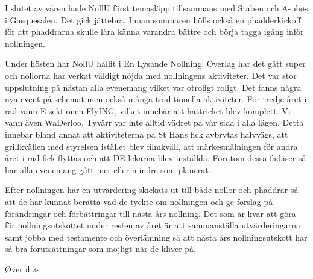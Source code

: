 \documentclass[../_main/handlingar.tex]{subfiles}
\begin{document}
I slutet av våren hade NollU först temasläpp tillsammans med Staben och A-phøs i Gasquesalen. Det gick jättebra. Innan sommaren hölls också en phadderkickoff för att phaddrarna skulle lära känna varandra bättre och börja tagga igång inför nollningen.

Under hösten har NollU hållit i En Lysande Nollning. Överlag har det gått super och nollorna har verkat väldigt nöjda med nollningens aktiviteter. Det var stor uppslutning på nästan alla evenemang vilket var otroligt roligt. Det fanns några nya event på schemat men också många traditionella aktiviteter. För tredje året i rad vann E-sektionen FlyING, vilket innebär att hattricket blev komplett. Vi vann även WaDerloo. Tyvärr var inte alltid vädret på vår sida i alla lägen. Detta innebar bland annat att aktiviteterna på St Hans fick avbrytas halvvägs, att grillkvällen med styrelsen istället blev filmkväll, att märkesmålningen för andra året i rad fick flyttas och att DE-lekarna blev inställda. Förutom dessa fadäser så har alla evenemang gått mer eller mindre som planerat.

Efter nollningen har en utvärdering skickats ut till både nollor och phaddrar så att de har kunnat berätta vad de tyckte om nollningen och ge förslag på förändringar och förbättringar till nästa års nollning. Det som är kvar att göra för nollningsutskottet under resten av året är att sammanställa utvärderingarna samt jobba med testamente och överlämning så att nästa års nollningsutskott har så bra förutsättningar som möjligt när de kliver på.

\begin{signatures}{1}
    \mvh
    \signature{Andreas Bennström}{Øverphøs}
\end{signatures}
\end{document}
